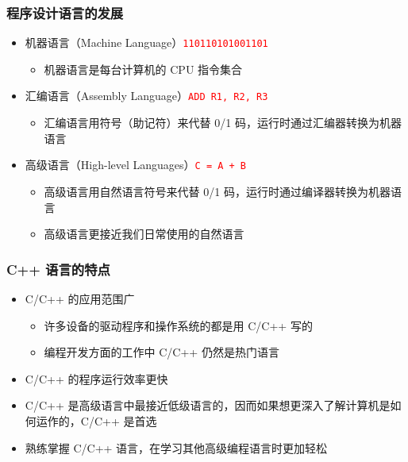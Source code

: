 \begin{frame}[fragile]
    \frametitle{程序设计语言的发展}

    \begin{itemize}
        \item<1-> 机器语言（Machine Language）\hfill \textcolor{red}{\lstinline|110110101001101|}

            \begin{itemize}
                \item 机器语言是每台计算机的 CPU 指令集合
            \end{itemize}

        \item<2-> 汇编语言（Assembly Language）\hfill \textcolor{red}{\lstinline|ADD R1, R2, R3|}

            \begin{itemize}
                \item 汇编语言用符号（助记符）来代替 0/1 码，运行时通过汇编器转换为机器语言
            \end{itemize}

        \item<3-> 高级语言（High-level Languages）\hfill \textcolor{red}{\lstinline|C = A + B|}

            \begin{itemize}
                \item 高级语言用自然语言符号来代替 0/1 码，运行时通过编译器转换为机器语言
                \item 高级语言更接近我们日常使用的自然语言
            \end{itemize}

    \end{itemize}
\end{frame}

\begin{frame}[fragile]
    \frametitle{C++ 语言的特点}

    \begin{itemize}
        \item<1-> C/C++ 的应用范围广

            \begin{itemize}
                \item 许多设备的驱动程序和操作系统的都是用 C/C++ 写的
                \item 编程开发方面的工作中 C/C++ 仍然是热门语言
            \end{itemize}

        \item<2-> C/C++ 的程序运行效率更快

        \item<3-> C/C++ 是高级语言中最接近低级语言的，因而如果想更深入了解计算机是如何运作的，C/C++ 是首选

        \item<4-> 熟练掌握 C/C++ 语言，在学习其他高级编程语言时更加轻松
    \end{itemize}
\end{frame}

